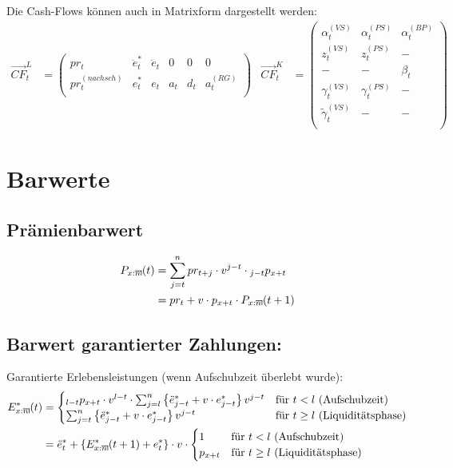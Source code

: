 \documentclass[a4paper,10pt]{article}
\makeatletter
\newcommand{\xn}{{\act[x]{n}}}
\DeclareRobustCommand{\act}[2][]{%
\def\arraystretch{0}%
\setlength\arraycolsep{0.5pt}%
\setlength\arrayrulewidth{0.5pt}%
\setbox0=\hbox{$\scriptstyle#1\ifx#1\empty{asdf}\else:\fi#2$}%
\begin{array}[b]{*2{@{}>{\scriptstyle}c}|}
\cline{2-2}%
\rule[1.25pt]{0pt}{\ht0}%
#1\ifx#1\empty\else:\fi & #2%
\end{array}%
}
\makeatother
\begin{document}
Die Cash-Flows können auch in Matrixform dargestellt werden:
\begin{align*}
%
 \overrightarrow{CF}^L_t &= \left(
 \begin{matrix} %
pr_t & \ddot{e}_t^{*} & \ddot{e}_t & 0 & 0 & 0 \\
pr^{(nachsch)}_t & e_t^{*} & e_t & a_t & d_t & a_t^{(RG)}\\
\end{matrix}
 \right)
% 
&
 \overrightarrow{CF}^K_t &= \left(
 \begin{matrix}
\alpha^{(VS)}_t & \alpha^{(PS)}_t  & \alpha^{(BP)}_t \\
z^{(VS)}_t & z^{(PS)}_t  & -\\
- & - & \beta_t \\
\gamma^{(VS)}_t & \gamma^{(PS)}_t & -\\
\widetilde{\gamma}^{(VS)}_t & - & -\\  
 \end{matrix}
 \right)
\end{align*}


\pagebreak

\section{Barwerte}

\subsection{Prämienbarwert}

\begin{align*} 
P_\xn(t) &= \sum_{j=t}^n pr_{t+j} \cdot v^{j-t}  \cdot {}_{j-t}p_{x+t}\\
	  &= pr_{t} + v \cdot p_{x+t} \cdot P_\xn(t+1)
\end{align*}

\subsection{Barwert garantierter Zahlungen:}
Garantierte Erlebensleistungen (wenn Aufschubzeit überlebt wurde):
\begin{align*} 
 E^{*}_\xn(t) &= \begin{cases}
		    {}_{l-t}p_{x+t} \cdot v^{l-t} \cdot \sum_{j=l}^{n} \left\{\ddot{e}^{*}_{j-t}+ v\cdot e^*_{j-t}\right\} v^{j-t} & \text{für $t<l$ (Aufschubzeit)}\\
		    \sum_{j=t}^{n} \left\{\ddot{e}^{*}_{j-t}+ v\cdot e^*_{j-t}\right\} v^{j-t} & \text{für $t\ge l$ (Liquiditätsphase)}
                 \end{cases}\\
   &= \ddot{e}_t^{*} + \left\{E^{*}_\xn(t+1) + e_t^*\right\}\cdot v \cdot \begin{cases}
	    1 & \text{für $t<l$ (Aufschubzeit)}\\
            p_{x+t} & \text{für $t\ge l$ (Liquiditätsphase)}
       \end{cases}
\end{align*}
\end{document}
